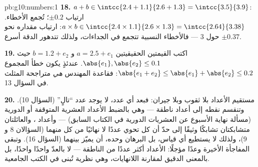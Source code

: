 \begin{solution}{pb:g10:numbers:1}
\textbf{18.} $a + b \in \intcc{2.4 + 1.1}{2.6 + 1.3} =
\intcc{3.5}{3.9}$: ارتياب $\pm 0.2$؛ تُجمع الأخطاء.
$a \times b \in \intcc{2.4 \times 1.1}{2.6 \times 1.3} =
\intcc{2.64}{3.38}$: ارتياب مقداره نحو $\pm 0.37$ حول
$3$ --- فالأخطاء النسبية تتجمع في الجداءات، ولذلك تتدهور الدقة
أسرع.

\textbf{19.} اكتب القيمتين الحقيقيتين $a = 2.5 + e_1$ و
$b = 1.2 + e_2$ حيث $\abs{e_1}, \abs{e_2} \leq 0.1$. عندئذٍ يكون
خطأ المجموع $\abs{e_1 + e_2} \leq \abs{e_1} +
\abs{e_2} \leq 0.2$: فقاعدة المهندس \emph{هي} متراجحة
المثلث في السؤال 13.

\textbf{20.} مستقيم الأعداد بلا ثقوب وبلا جيران: فبعد
أي عدد، لا يوجد عدد ``تالٍ'' (السؤال 10). وتنقسم نقطه
إلى أعداد ناطقة --- وهي بالضبط الأعداد العشرية المتوقفة أو
الدورية (مسألة نهاية الأسبوع عن العشريات الدورية في الكتاب السابق) --- وأعداد ،
والعائلتان متشابكتان تشابكًا وثيقًا إلى حدّ أن كل
 تحوي عددًا لا نهائيًا من كل منهما (السؤالان 8 و 9)،
ولذلك لا يستطيع أي قياس، بل البرهان وحده، أن يميّز بينهما
(السؤال 16). وتبقى المفاجأة الأخيرة وعدًا مؤجلًا:
الأعداد  أكثر عددًا من الناطقة --- لا بالعدّ واحدًا
واحدًا، بل بالمعنى الدقيق لمقارنة اللانهايات، وهي
نظرية تُبنى في الكتب الجامعية.
\end{solution}
